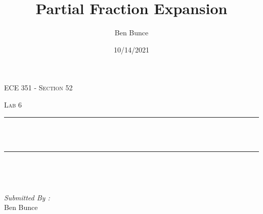\documentclass[12pt]{report}
\title{Partial Fraction Expansion}
\author{Ben Bunce}
\date{10/14/2021}
\makeatletter
\let\thetitle\@title
\makeatother
\begin{document}

\begin{titlepage}
	\centering
    \vspace*{0.5 cm}
\begin{center}    \textsc{\Large   ECE 351 - Section 52}\\[2.0 cm]	\end{center}%
	\textsc{\Large Lab 6  }\\[0.5 cm]				%
	\rule{\linewidth}{0.2 mm} \\[0.4 cm]
	{ \huge \bfseries \thetitle}\\
	\rule{\linewidth}{0.2 mm} \\[1.5 cm]
	
	\begin{minipage}{0.4\textwidth}
		\begin{flushleft} \large
			\end{flushleft}
			\end{minipage}~
			\begin{minipage}{0.4\textwidth}
            
			\begin{flushright} \large
			\emph{Submitted By :} \\
			Ben Bunce  
		\end{flushright}
           
	\end{minipage}\\[2 cm]
	
    
    
    
    
	
\end{titlepage}


\tableofcontents
\pagebreak

\renewcommand{\thesection}{\arabic{section}}
\end{document}
